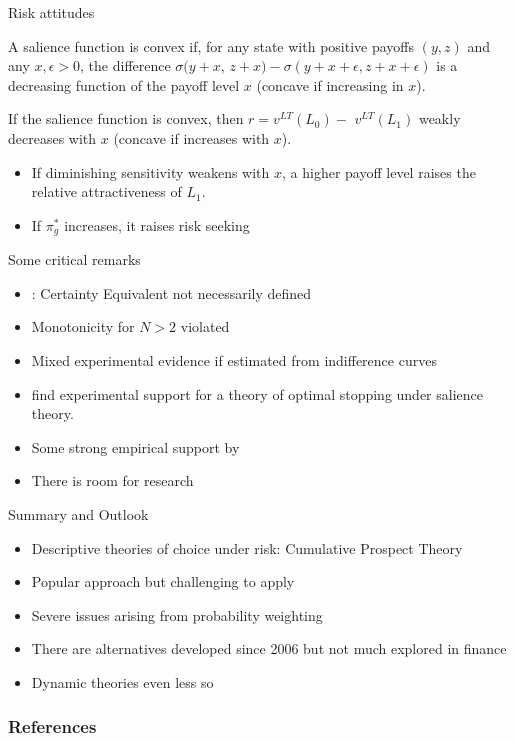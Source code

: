 \documentclass[11pt, aspectratio=169]{beamer}
\begin{document}
\begin{frame}{Risk attitudes}
    \begin{definition}
        A salience function is convex if, for any state with positive payoffs $(y, z)$ and any $x, \epsilon>0$, the difference $\sigma(y+x$, $z+x)-\sigma(y+x+\epsilon, z+x+\epsilon)$ is a decreasing function of the payoff level $x$ (concave if increasing in $x$).
    \end{definition}
    \begin{Lemma}
        If the salience function is convex, then $r=v^{L T}\left(L_0\right)-$ $v^{L T}\left(L_1\right)$ weakly decreases with $x$   (concave if increases with $x$).
    \end{Lemma}
   \begin{itemize}
   \item If diminishing sensitivity weakens with $x$, a higher payoff level raises the relative attractiveness of  $L_1$.\medskip
   \item If $\pi_g^* $ increases, it raises risk seeking
    \end{itemize}
\end{frame}

\begin{frame}{Some critical remarks}
    \begin{itemize}
        \item \citet{Kontek2016}: Certainty Equivalent not necessarily defined\medskip
        \item Monotonicity for $N>2$ violated\medskip
        \item Mixed experimental evidence if estimated from indifference curves\medskip
	\item \citet{Dertwinkel-KaltFrey2023} find experimental support for a theory of optimal stopping under salience theory.\medskip
        \item Some strong empirical support by \citet{CosemansFrehen2021}\medskip
        \item There is room for research\medskip
	\end{itemize}
\end{frame}

\begin{frame}{Summary and Outlook}
\begin{itemize}
\item Descriptive theories of choice under risk: Cumulative Prospect Theory\medskip
\item Popular approach but challenging to apply\medskip
\item Severe issues arising from probability weighting\medskip
\item There are alternatives developed since 2006 but not much explored in finance\medskip
\item Dynamic theories even less so\medskip
\end{itemize}
\end{frame}

\begin{frame}[allowframebreaks]
    \frametitle{References}
    \renewcommand{\bibfont}{\normalfont\footnotesize}
    \printbibliography
\end{frame}
\end{document}
